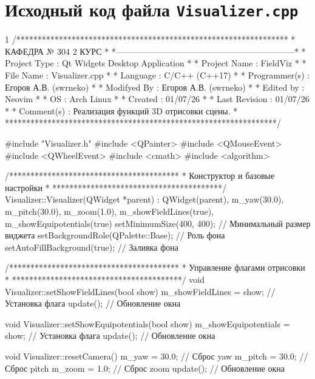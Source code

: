 \section{Исходный код файла \texttt{Visualizer.cpp}}
\footnotesize
\begin{listing}{1}
/****************************************************************
*                     КАФЕДРА № 304 2 КУРС                       *
*---------------------------------------------------------------*
* Project Type  : Qt Widgets Desktop Application                *
* Project Name  : FieldViz                                      *
* File Name     : Visualizer.cpp                                 *
* Language      : C/C++ (C++17)                                  *
* Programmer(s) : Егоров А.В. (swrneko)                          *
* Modifyed By   : Егоров А.В. (swrneko)                          *
* Edited by     : Neovim                                         *
* OS            : Arch Linux                                     *
* Created       : 01/07/26                                       *
* Last Revision : 01/07/26                                       *
* Comment(s)    : Реализация функций 3D отрисовки сцены.         *
****************************************************************/

#include "Visualizer.h"
#include <QPainter>
#include <QMouseEvent>
#include <QWheelEvent>
#include <cmath>
#include <algorithm>

/****************************************
* Конструктор и базовые настройки       *
****************************************/
Visualizer::Visualizer(QWidget *parent)
  : QWidget(parent), m_yaw(30.0), m_pitch(30.0), m_zoom(1.0),
    m_showFieldLines(true), m_showEquipotentials(true) {
  setMinimumSize(400, 400); // Минимальный размер виджета
  setBackgroundRole(QPalette::Base); // Роль фона
  setAutoFillBackground(true); // Заливка фона
}

/****************************************
* Управление флагами отрисовки          *
****************************************/
void Visualizer::setShowFieldLines(bool show) {
  m_showFieldLines = show; // Установка флага
  update(); // Обновление окна
}

void Visualizer::setShowEquipotentials(bool show) {
  m_showEquipotentials = show; // Установка флага
  update(); // Обновление окна
}

void Visualizer::resetCamera() {
  m_yaw = 30.0; // Сброс yaw
  m_pitch = 30.0; // Сброс pitch
  m_zoom = 1.0; // Сброс zoom
  update(); // Обновление окна
}


\end{listing}
